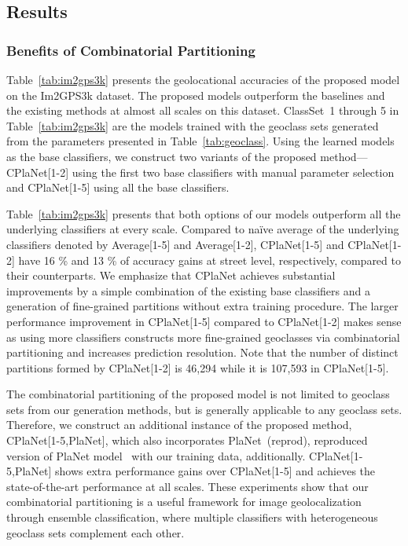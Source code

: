 \documentclass[runningheads]{llncs}
\begin{document}
\subsection{Results}

\subsubsection{Benefits of Combinatorial Partitioning}

Table~\ref{tab:im2gps3k} presents the geolocational accuracies of the proposed model on the Im2GPS3k dataset.
The proposed models outperform the baselines and the existing methods at almost all scales on this dataset.
ClassSet~1 through 5 in Table~\ref{tab:im2gps3k} are the models trained with the geoclass sets generated from the parameters presented in Table~\ref{tab:geoclass}.
Using the learned models as the base classifiers, we construct two variants of the proposed method---{CPlaNet}[1-2] using the first two base classifiers with manual parameter selection and CPlaNet[1-5] using all the base classifiers.


Table~\ref{tab:im2gps3k} presents that both options of our models outperform all the underlying classifiers at every scale.
Compared to na\"ive average of the underlying classifiers denoted by Average[1-5] and Average[1-2], {CPlaNet}[1-5] and {CPlaNet}[1-2] have 16 \% and 13 \% of accuracy gains at street level, respectively, compared to their counterparts.
We emphasize that {CPlaNet} achieves substantial improvements by a simple combination of the existing base classifiers and a generation of fine-grained partitions without extra training procedure.
The larger performance improvement in {CPlaNet}[1-5] compared to {CPlaNet}[1-2] makes sense as using more classifiers constructs more fine-grained geoclasses via combinatorial partitioning and increases prediction resolution.
Note that the number of distinct partitions formed by {CPlaNet}[1-2] is 46,294 while it is 107,593 in CPlaNet[1-5].

The combinatorial partitioning of the proposed model is not limited to geoclass sets from our generation methods, but is generally applicable to any geoclass sets.
Therefore, we construct an additional instance of the proposed method, {CPlaNet}[1-5,PlaNet], which also incorporates PlaNet~(reprod), reproduced version of PlaNet model~\cite{weyand16planet} with our training data, additionally.
{CPlaNet}[1-5,PlaNet] shows extra performance gains over {CPlaNet}[1-5] and achieves the state-of-the-art performance at all scales.
These experiments show that our combinatorial partitioning is a useful framework for image geolocalization through ensemble classification, where multiple classifiers with heterogeneous geoclass sets complement each other.
\end{document}
